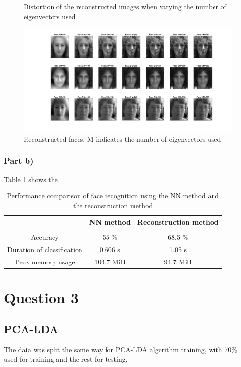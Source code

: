 \documentclass[10pt,technote]{IEEEtran}
\begin{document}
\begin{figure}[htb!]
\begin{subfigure}[b]{\linewidth}
        \quad
    \end{subfigure}
    \caption{Distortion of the reconstructed images when varying the number of eigenvectors used}
    \label{fig:distortion}
\end{figure}
\begin{figure}[htb!]
    \centering
    \includegraphics[width=\linewidth]{../results/ex1aa/face_plots.png}
    \caption{Reconstructed faces, M indicates the number of eigenvectors used}
    \label{fig:reconstr_faces}
\end{figure}

\subsubsection{Part b)}
Table \ref{tab:NNvsRec} shows the 

\begin{table}[]
    \centering
    \begin{tabular}{c||c c}
         & NN method & Reconstruction method  \\\hline \hline\\
         Accuracy &  55 \% & 68.5 \% \\
         Duration of classification & 0.606 s & 1.05 s \\
         Peak memory usage & 104.7 MiB & 94.7 MiB
         
    \end{tabular}
    \caption{Performance comparison of face recognition using the NN method and the reconstruction method}
    \label{tab:NNvsRec}
\end{table}

\section{Question 3}
\subsection{PCA-LDA}
The data was split the same way for PCA-LDA algorithm training, with 70\% used for training and the rest for testing. 
\end{document}
